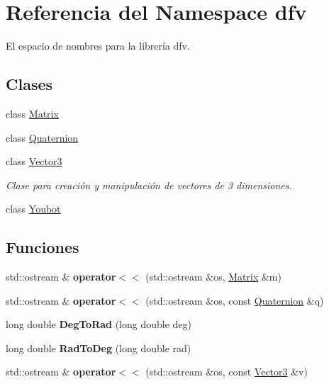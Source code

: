\hypertarget{namespacedfv}{\section{\-Referencia del \-Namespace dfv}
\label{namespacedfv}
}


\-El espacio de nombres para la librería dfv.  


\subsection*{\-Clases}
\begin{DoxyCompactItemize}
\item 
class \hyperlink{classdfv_1_1Matrix}{\-Matrix}
\item 
class \hyperlink{classdfv_1_1Quaternion}{\-Quaternion}
\item 
class \hyperlink{classdfv_1_1Vector3}{\-Vector3}
\begin{DoxyCompactList}\small\item\em \-Clase para creación y manipulación de vectores de 3 dimensiones. \end{DoxyCompactList}\item 
class \hyperlink{classdfv_1_1Youbot}{\-Youbot}
\end{DoxyCompactItemize}
\subsection*{\-Funciones}
\begin{DoxyCompactItemize}
\item 
\hypertarget{namespacedfv_ad8927f67ba8edddcac516b42526469cb}{std\-::ostream \& {\bfseries operator$<$$<$} (std\-::ostream \&os, \hyperlink{classdfv_1_1Matrix}{\-Matrix} \&m)}\label{namespacedfv_ad8927f67ba8edddcac516b42526469cb}

\item 
\hypertarget{namespacedfv_a34afb9ee3a4d367ed0ff26803a02e9a6}{std\-::ostream \& {\bfseries operator$<$$<$} (std\-::ostream \&os, const \hyperlink{classdfv_1_1Quaternion}{\-Quaternion} \&q)}\label{namespacedfv_a34afb9ee3a4d367ed0ff26803a02e9a6}

\item 
\hypertarget{namespacedfv_a728989b94aadab2a56a40bbcc93f2d06}{long double {\bfseries \-Deg\-To\-Rad} (long double deg)}\label{namespacedfv_a728989b94aadab2a56a40bbcc93f2d06}

\item 
\hypertarget{namespacedfv_a24f4e4cf53fd0ddfb8ac2359c34fbe4b}{long double {\bfseries \-Rad\-To\-Deg} (long double rad)}\label{namespacedfv_a24f4e4cf53fd0ddfb8ac2359c34fbe4b}

\item 
\hypertarget{namespacedfv_a1ba60f8078ec59cd17d8c8d34ee19240}{std\-::ostream \& {\bfseries operator$<$$<$} (std\-::ostream \&os, const \hyperlink{classdfv_1_1Vector3}{\-Vector3} \&v)}\label{namespacedfv_a1ba60f8078ec59cd17d8c8d34ee19240}

\end{DoxyCompactItemize}
